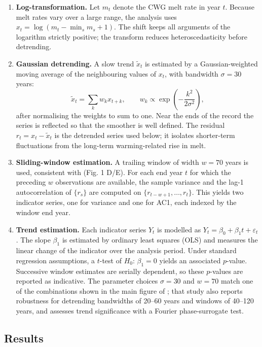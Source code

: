 \documentclass[
]{krantz}
\begin{document}
\begin{enumerate}
\def\labelenumi{\arabic{enumi}.}
\item
  \textbf{Log-transformation.} Let \(m_t\) denote the CWG melt rate in year \(t\).
  Because melt rates vary over a large range, the analysis uses
  \(x_t = \log(m_t - \min_s m_s + 1)\). The shift keeps all arguments of the
  logarithm strictly positive; the transform reduces heteroscedasticity
  before detrending.
\item
  \textbf{Gaussian detrending.} A slow trend \(\tilde x_t\) is estimated by a
  Gaussian-weighted moving average of the neighbouring values of \(x_t\),
  with bandwidth \(\sigma = 30\) years:
  \[
  \tilde x_t = \sum_{k} w_k x_{t+k}, \qquad
  w_k \propto \exp\!\left(-\frac{k^2}{2\sigma^2}\right),
  \]
  after normalising the weights to sum to one. Near the ends of the
  record the series is reflected so that the smoother is well defined.
  The residual \(r_t = x_t - \tilde x_t\) is the detrended series used
  below; it isolates shorter-term fluctuations from the long-term
  warming-related rise in melt.
\item
  \textbf{Sliding-window estimation.} A trailing window of width \(w = 70\)
  years is used, consistent with \citet{boers2021} (Fig. 1 D/E). For each end
  year \(t\) for which the preceding \(w\) observations are available, the
  sample variance and the lag-1 autocorrelation of \(\{r_s\}\) are computed
  on \(\{r_{t-w+1},\ldots,r_t\}\). This yields two indicator series, one for
  variance and one for AC1, each indexed by the window end year.
\item
  \textbf{Trend estimation.} Each indicator series \(Y_t\) is modelled as
  \(Y_t = \beta_0 + \beta_1 t + \varepsilon_t\). The slope \(\beta_1\) is
  estimated by ordinary least squares (OLS) and measures the linear
  change of the indicator over the analysis period. Under standard
  regression assumptions, a \(t\)-test of \(H_0\!:\,\beta_1 = 0\) yields an
  associated \(p\)-value. Successive window estimates are serially
  dependent, so these \(p\)-values are reported as indicative. The
  parameter choices \(\sigma = 30\) and \(w = 70\) match one of the
  combinations shown in the main figure of \citet{boers2021}; that study also
  reports robustness for detrending bandwidths of 20--60 years and
  windows of 40--120 years, and assesses trend significance with a
  Fourier phase-surrogate test.
\end{enumerate}

\subsection{Results}\label{results-6}
\end{document}
